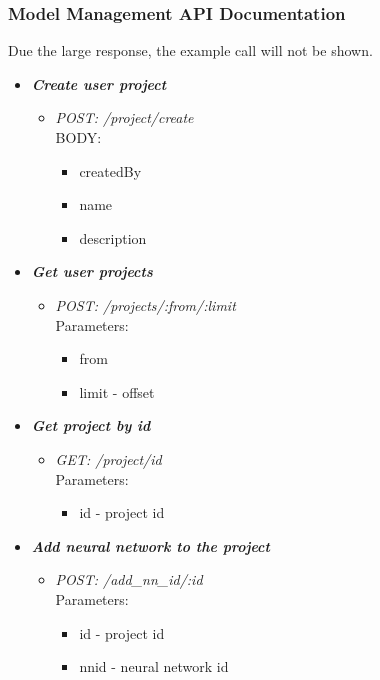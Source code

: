 \subsubsection{Model Management API Documentation}\label{Model Management Documentation}

Due the large response, the example call will not be shown.

\begin{itemize}
\item \textbf{\textit{Create user project}}
\begin{itemize}
\item \emph{POST: /project/create}
\\ BODY:
\begin{itemize}
\item createdBy
\item name
\item description
\end{itemize}

\end{itemize}




\item \textbf{\textit{Get user projects}}
\begin{itemize}
\item \emph{POST: /projects/:from/:limit}
\\Parameters:
\begin{itemize}
\item from 
\item limit - offset
\end{itemize}
\end{itemize}



\item \textbf{\textit{Get project by id}}
\begin{itemize}
\item \emph{GET: /project/id}
\\Parameters:
\begin{itemize}
\item id - project id 
\end{itemize}
\end{itemize}




\item \textbf{\textit{Add neural network to the project}}
\begin{itemize}
\item \emph{POST: /add\_nn\_id/:id}
\\Parameters:
\begin{itemize}
\item id - project id 
\item nnid - neural network id
\end{itemize}
\end{itemize}



\end{itemize}

